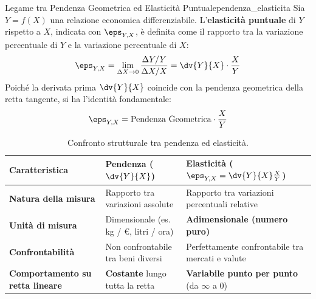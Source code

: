 \begin{teorema}{Legame tra Pendenza Geometrica ed Elasticità Puntuale}{pendenza_elasticita}
Sia $Y = f(X)$ una relazione economica differenziabile. L'\textbf{elasticità puntuale} di $Y$ rispetto a $X$, indicata con $\eps_{Y,X}$, è definita come il rapporto tra la variazione percentuale di $Y$ e la variazione percentuale di $X$:
\begin{equation}
    \eps_{Y,X} = \lim_{\Delta X \to 0} \frac{\Delta Y / Y}{\Delta X / X} = \dv{Y}{X} \cdot \frac{X}{Y}
\end{equation}
Poiché la derivata prima $\dv{Y}{X}$ coincide con la pendenza geometrica della retta tangente, si ha l'identità fondamentale:
\begin{equation}
    \eps_{Y,X} = \text{Pendenza Geometrica} \cdot \frac{X}{Y}
\end{equation}
\end{teorema}

\begin{table}[htbp]
\centering
\small
\begin{tabularx}{\textwidth}{lXX}
\toprule
\textbf{Caratteristica} & \textbf{Pendenza ($\dv{Y}{X}$)} & \textbf{Elasticità ($\eps_{Y,X} = \dv{Y}{X} \frac{X}{Y}$)} \\
\midrule
\textbf{Natura della misura} & Rapporto tra variazioni assolute & Rapporto tra variazioni percentuali relative \\
\textbf{Unità di misura} & Dimensionale (es. kg / \euro{}, litri / ora) & \textbf{Adimensionale (numero puro)} \\
\textbf{Confrontabilità} & Non confrontabile tra beni diversi & Perfettamente confrontabile tra mercati e valute \\
\textbf{Comportamento su retta lineare} & \textbf{Costante} lungo tutta la retta & \textbf{Variabile punto per punto} (da $\infty$ a $0$) \\
\bottomrule
\end{tabularx}
\caption{Confronto strutturale tra pendenza ed elasticità.}
\label{tab:pendenza_vs_elasticita}
\end{table}

